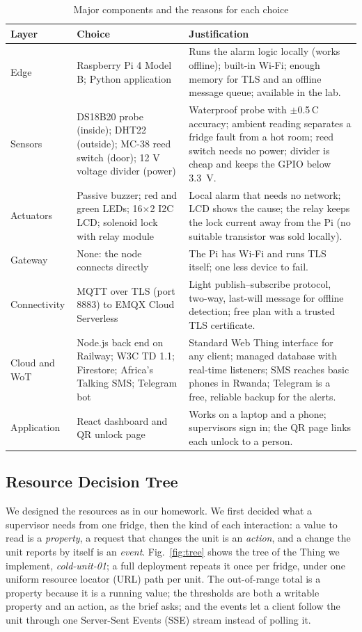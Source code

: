 \documentclass[conference,12pt]{IEEEtran}
\newcommand{\degC}{\,\textdegree{}C}
\begin{document}
\begin{table}[!t]
\caption{Major components and the reasons for each choice}
\label{tab:components}
\centering
\footnotesize
\renewcommand{\arraystretch}{1.15}
\begin{tabular}{@{}p{2.0cm}p{5.2cm}p{8.6cm}@{}}
\toprule
\textbf{Layer} & \textbf{Choice} & \textbf{Justification} \\
\midrule
Edge &
Raspberry Pi 4 Model B; Python application &
Runs the alarm logic locally (works offline); built-in Wi-Fi; enough memory for TLS and an
offline message queue; available in the lab. \\
Sensors &
DS18B20 probe (inside); DHT22 (outside); MC-38 reed switch (door); 12 V voltage divider (power) &
Waterproof probe with $\pm$0.5\degC{} accuracy; ambient reading separates a fridge fault from a
hot room; reed switch needs no power; divider is cheap and keeps the GPIO below 3.3~V. \\
Actuators &
Passive buzzer; red and green LEDs; 16$\times$2 I2C LCD; solenoid lock with relay module &
Local alarm that needs no network; LCD shows the cause; the relay keeps the lock current away from
the Pi (no suitable transistor was sold locally). \\
Gateway &
None: the node connects directly &
The Pi has Wi-Fi and runs TLS itself; one less device to fail. \\
Connectivity &
MQTT over TLS (port 8883) to EMQX Cloud Serverless &
Light publish--subscribe protocol, two-way, last-will message for offline detection; free plan
with a trusted TLS certificate. \\
Cloud and WoT &
Node.js back end on Railway; W3C TD 1.1; Firestore; Africa's Talking SMS; Telegram bot &
Standard Web Thing interface for any client; managed database with real-time listeners; SMS
reaches basic phones in Rwanda; Telegram is a free, reliable backup for the alerts. \\
Application &
React dashboard and QR unlock page &
Works on a laptop and a phone; supervisors sign in; the QR page links each unlock to a person. \\
\bottomrule
\end{tabular}
\end{table}

\subsection{Resource Decision Tree}

We designed the resources as in our homework. We first decided what a supervisor needs from one
fridge, then the kind of each interaction: a value to read is a \emph{property}, a request that
changes the unit is an \emph{action}, and a change the unit reports by itself is an \emph{event}.
Fig.~\ref{fig:tree} shows the tree of the Thing we implement, \emph{cold-unit-01}; a full
deployment repeats it once per fridge, under one uniform resource locator (URL) path per unit. The
out-of-range total is a property because it is a running value; the thresholds are both a writable
property and an action, as the brief asks; and the events let a client follow the unit through one
Server-Sent Events (SSE) stream instead of polling it.
\end{document}
